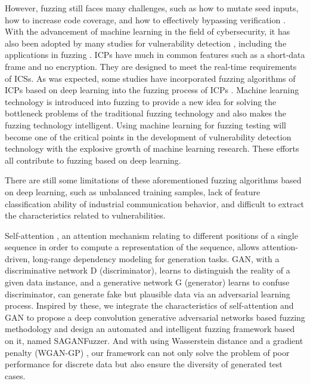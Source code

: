 However, fuzzing still faces many challenges, such as how to mutate seed inputs, how to increase code coverage, and how to effectively bypassing verification \cite{li2018fuzzing}.
With the advancement of machine learning in the field of cybersecurity, it has also been adopted by many studies for vulnerability detection\cite{grieco2016toward} \cite{wu2017vulnerability} \cite{chernis2018machine}, including the applications in fuzzing \cite{godefroid2017learn} \cite{rajpal2017not} \cite{wang2017skyfire} \cite{she2019neuzz} \cite{liu2019reinforcement}. ICPs have much in common features such as a short-data frame and no encryption. They are designed to meet the real-time requirements of ICSs. As was expected, some studies have incorporated fuzzing algorithms of ICPs based on deep learning into the fuzzing process of ICPs \cite{hu2018ganfuzz} \cite{li2019intelligent}. Machine learning technology is introduced into fuzzing to provide a new idea for solving the bottleneck problems of the traditional fuzzing technology and also makes the fuzzing technology intelligent. Using machine learning for fuzzing testing will become one of the critical points in the development of vulnerability detection technology with the explosive growth of machine learning research. These efforts all contribute to fuzzing based on deep learning.

There are still some limitations of these aforementioned fuzzing algorithms based on deep learning, such as unbalanced training samples, lack of feature classification ability of industrial communication behavior, and difficult to extract the characteristics related to vulnerabilities. 

Self-attention \cite{vaswani2017attention}, an attention mechanism relating to different positions of a single sequence in order to compute a representation of the sequence, allows attention-driven, long-range dependency modeling for generation tasks. GAN, with a discriminative network D (discriminator), learns to distinguish the reality of a
given data instance, and a generative network G (generator) learns to confuse discriminator, can generate fake but plausible data via an adversarial learning process. Inspired by these, we integrate the characteristics of self-attention and GAN to propose a deep convolution generative adversarial networks based fuzzing methodology and design an automated and intelligent fuzzing framework based on it, named SAGANFuzzer. And with using Wasserstein distance and a gradient penalty (WGAN-GP) \cite{gulrajani2017improved}, our framework can not only solve the problem of poor performance for discrete data but also ensure the diversity of generated test cases.

